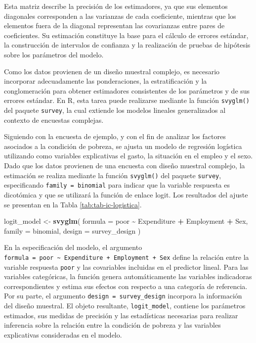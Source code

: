 \documentclass[
  spanish,
  12pt,
]{book}
\newenvironment{Shaded}{\begin{snugshade}}{\end{snugshade}}
\newcommand{\AttributeTok}[1]{\textcolor[rgb]{0.13,0.29,0.53}{#1}}
\newcommand{\FunctionTok}[1]{\textcolor[rgb]{0.13,0.29,0.53}{\textbf{#1}}}
\newcommand{\NormalTok}[1]{#1}
\newcommand{\OtherTok}[1]{\textcolor[rgb]{0.56,0.35,0.01}{#1}}
\newcommand{\SpecialCharTok}[1]{\textcolor[rgb]{0.81,0.36,0.00}{\textbf{#1}}}
\begin{document}
Esta matriz describe la precisión de los estimadores, ya que sus elementos diagonales corresponden a las varianzas de cada coeficiente, mientras que los elementos fuera de la diagonal representan las covarianzas entre pares de coeficientes. Su estimación constituye la base para el cálculo de errores estándar, la construcción de intervalos de confianza y la realización de pruebas de hipótesis sobre los parámetros del modelo.

Como los datos provienen de un diseño muestral complejo, es necesario incorporar adecuadamente las ponderaciones, la estratificación y la conglomeración para obtener estimadores consistentes de los parámetros y de sus errores estándar. En R, esta tarea puede realizarse mediante la función \texttt{svyglm()} del paquete \texttt{survey}, la cual extiende los modelos lineales generalizados al contexto de encuestas complejas.

Siguiendo con la encuesta de ejemplo, y con el fin de analizar los factores asociados a la condición de pobreza, se ajusta un modelo de regresión logística utilizando como variables explicativas el gasto, la situación en el empleo y el sexo. Dado que los datos provienen de una encuesta con diseño muestral complejo, la estimación se realiza mediante la función \texttt{svyglm()} del paquete \texttt{survey}, especificando \texttt{family\ =\ binomial} para indicar que la variable respuesta es dicotómica y que se utilizará la función de enlace logit. Los resultados del ajuste se presentan en la Tabla \ref{tab:tab-ic-logistica}.

\begin{Shaded}
\begin{Highlighting}[]
\NormalTok{logit\_model }\OtherTok{\textless{}{-}} \FunctionTok{svyglm}\NormalTok{(}
  \AttributeTok{formula =}\NormalTok{ poor }\SpecialCharTok{\textasciitilde{}}\NormalTok{ Expenditure }\SpecialCharTok{+}\NormalTok{ Employment }\SpecialCharTok{+}\NormalTok{ Sex,}
  \AttributeTok{family =}\NormalTok{ binomial,}
  \AttributeTok{design =}\NormalTok{ survey\_design}
\NormalTok{)}
\end{Highlighting}
\end{Shaded}

En la especificación del modelo, el argumento \texttt{formula\ =\ poor\ \textasciitilde{}\ Expenditure\ +\ Employment\ +\ Sex} define la relación entre la variable respuesta \texttt{poor} y las covariables incluidas en el predictor lineal. Para las variables categóricas, la función genera automáticamente las variables indicadoras correspondientes y estima sus efectos con respecto a una categoría de referencia. Por su parte, el argumento \texttt{design\ =\ survey\_design} incorpora la información del diseño muestral. El objeto resultante, \texttt{logit\_model}, contiene los parámetros estimados, sus medidas de precisión y las estadísticas necesarias para realizar inferencia sobre la relación entre la condición de pobreza y las variables explicativas consideradas en el modelo.
\end{document}
